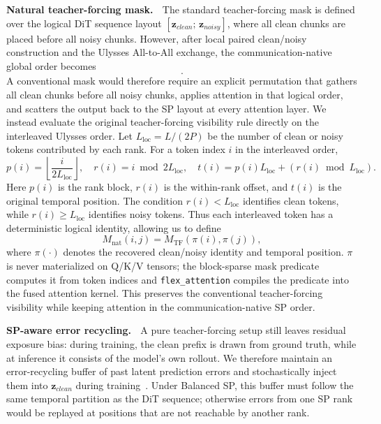 \documentclass{llmxive}
\begin{document}
\textbf{Natural teacher-forcing mask.} $\;$
The standard teacher-forcing mask is defined over the logical DiT sequence layout $[\mathbf{z}_{clean};\,\mathbf{z}_{noisy}]$, where all clean chunks are placed before all noisy chunks.
However, after local paired clean/noisy construction and the Ulysses All-to-All exchange, the communication-native global order becomes
\begin{equation}
    [\mathbf{z}_{clean}^{(0)},\mathbf{z}_{noisy}^{(0)},\ldots,
    \mathbf{z}_{clean}^{(P-1)},\mathbf{z}_{noisy}^{(P-1)}].
\end{equation}
A conventional mask would therefore require an explicit permutation that gathers all clean chunks before all noisy chunks, applies attention in that logical order, and scatters the output back to the SP layout at every attention layer.
We instead evaluate the original teacher-forcing visibility rule directly on the interleaved Ulysses order.
Let $L_{\mathrm{loc}}=L/(2P)$ be the number of clean or noisy tokens contributed by each rank.
For a token index $i$ in the interleaved order,
\begin{equation}
    p(i)=\left\lfloor \frac{i}{2L_{\mathrm{loc}}} \right\rfloor,\quad
    r(i)=i\bmod 2L_{\mathrm{loc}},\quad
    t(i)=p(i)L_{\mathrm{loc}} + (r(i)\bmod L_{\mathrm{loc}}).
\end{equation}
Here $p(i)$ is the rank block, $r(i)$ is the within-rank offset, and $t(i)$ is the original temporal position.
The condition $r(i)<L_{\mathrm{loc}}$ identifies clean tokens, while $r(i)\ge L_{\mathrm{loc}}$ identifies noisy tokens.
Thus each interleaved token has a deterministic logical identity, allowing us to define
\begin{equation}
    M_{\mathrm{nat}}(i,j)=M_{\mathrm{TF}}(\pi(i),\pi(j)),
\end{equation}
where $\pi(\cdot)$ denotes the recovered clean/noisy identity and temporal position.
$\pi$ is never materialized on Q/K/V tensors; the block-sparse mask predicate computes it from token indices and \texttt{flex\_attention} compiles the predicate into the fused attention kernel.
This preserves the conventional teacher-forcing visibility while keeping attention in the communication-native SP order.

\textbf{SP-aware error recycling.} $\;$
A pure teacher-forcing setup still leaves residual exposure bias: during training, the clean prefix is drawn from ground truth, while at inference it consists of the model's own rollout.
We therefore maintain an error-recycling buffer of past latent prediction errors and stochastically inject them into $\mathbf{z}_{clean}$ during training~\cite{li2025stable}.
Under Balanced SP, this buffer must follow the same temporal partition as the DiT sequence; otherwise errors from one SP rank would be replayed at positions that are not reachable by another rank.
\end{document}
